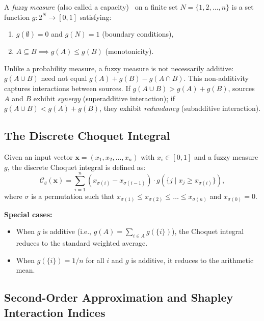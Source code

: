 A \emph{fuzzy measure} (also called a capacity)~\cite{sugeno1974theory} on a finite set $N = \{1, 2, \ldots, n\}$ is a set function $g: 2^N \to [0, 1]$ satisfying:
\begin{enumerate}
    \item $g(\emptyset) = 0$ and $g(N) = 1$ (boundary conditions),
    \item $A \subseteq B \implies g(A) \leq g(B)$ (monotonicity).
\end{enumerate}

Unlike a probability measure, a fuzzy measure is not necessarily additive: $g(A \cup B)$ need not equal $g(A) + g(B) - g(A \cap B)$.
This non-additivity captures interactions between sources.
If $g(A \cup B) > g(A) + g(B)$, sources $A$ and $B$ exhibit \emph{synergy} (superadditive interaction); if $g(A \cup B) < g(A) + g(B)$, they exhibit \emph{redundancy} (subadditive interaction).

\subsection{The Discrete Choquet Integral}
\label{sec:bg:choquet:integral}

Given an input vector $\mathbf{x} = (x_1, x_2, \ldots, x_n)$ with $x_i \in [0, 1]$ and a fuzzy measure $g$, the discrete Choquet integral is defined as:
\begin{equation}
\label{eq:choquet}
\mathcal{C}_g(\mathbf{x}) = \sum_{i=1}^{n} \left(x_{\sigma(i)} - x_{\sigma(i-1)}\right) \cdot g\left(\{j \mid x_j \geq x_{\sigma(i)}\}\right),
\end{equation}
where $\sigma$ is a permutation such that $x_{\sigma(1)} \leq x_{\sigma(2)} \leq \ldots \leq x_{\sigma(n)}$ and $x_{\sigma(0)} = 0$.

\textbf{Special cases:}
\begin{itemize}
    \item When $g$ is additive (i.e., $g(A) = \sum_{i \in A} g(\{i\})$), the Choquet integral reduces to the standard weighted average.
    \item When $g(\{i\}) = 1/n$ for all $i$ and $g$ is additive, it reduces to the arithmetic mean.
\end{itemize}

\subsection{Second-Order Approximation and Shapley Interaction Indices}
\label{sec:bg:choquet:secondorder}

